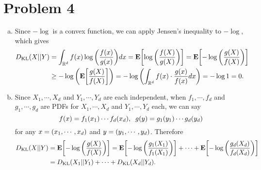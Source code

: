 \documentclass[10pt]{article}
\begin{document}
\section*{Problem 4}
\begin{enumerate}[(a)]
    \item Since $-\log$ is a convex function, we can apply Jensen's inequality to $-\log$, which gives
    \begin{align*}
        D_{\mathrm{KL}}(X||Y) &= \int_{\mathbb{R}^d}f(x)\log\qty(\frac{f(x)}{g(x)})dx = \mathbf{E}\qty[\log\qty(\frac{f(X)}{g(X)})] = \mathbf{E}\qty[-\log\qty(\frac{g(X)}{f(X)})] \\
        &\geq -\log\qty(\mathbf{E}\qty[\frac{g(X)}{f(X)}]) = -\log\qty(\int_{\mathbb{R}^d}f(x)\cdot\frac{g(x)}{f(x)}dx) = -\log{1} = 0.
    \end{align*}
    \item Since $X_1, \cdots, X_d$ and $Y_1, \cdots, Y_d$ are each independent, when $f_1, \cdots, f_d$ and $g_1, \cdots, g_d$ are PDFs for $X_1, \cdots, X_d$ and $Y_1, \cdots, Y_d$ each,
    we can say
    \begin{equation*}
        f(x) = f_1\qty(x_1) \cdots f_d\qty(x_d), \;\; g(y) = g_1\qty(y_1) \cdots g_d\qty(y_d)
    \end{equation*}
    for any $x = \qty(x_1, \cdots, x_d)$ and $y = \qty(y_1, \cdots, y_d)$.
    Therefore
    \begin{align*}
        D_{\mathrm{KL}}(X||Y) &= \mathbf{E}\qty[-\log\qty(\frac{g(X)}{f(X)})] = \mathbf{E}\qty[-\log\qty(\frac{g_1\qty(X_1)}{f_1\qty(X_1)})] + \cdots + \mathbf{E}\qty[-\log\qty(\frac{g_d\qty(X_d)}{f_d\qty(X_d)})] \\
        &= D_{\mathrm{KL}}(X_1||Y_1) + \cdots + D_{\mathrm{KL}}(X_d||Y_d).
    \end{align*}
\end{enumerate}
\end{document}
